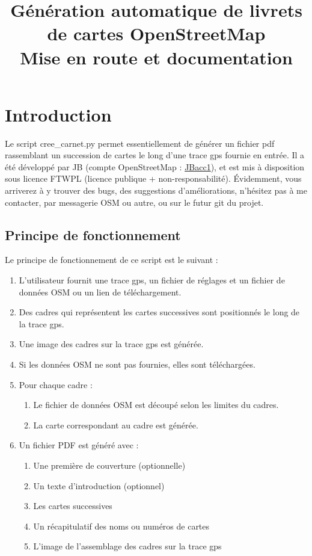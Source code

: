 \documentclass[12pt,french]{article}
\begin{document}
\title{Génération automatique de livrets de cartes OpenStreetMap\\ Mise en route et documentation}
\date{}
\author{}


\maketitle
\tableofcontents
\newpage

\section{Introduction}
Le script cree\_carnet.py permet essentiellement de générer un fichier pdf rassemblant un succession de cartes le long d'une trace gps fournie en entrée. Il a été développé par JB (compte OpenStreetMap : \href{http://openstreetmap.org/user/JBacc1}{JBacc1}), et est mis à disposition sous licence FTWPL (licence publique + non-responsabilité). Évidemment, vous arriverez à y trouver des bugs, des suggestions d'améliorations, n'hésitez pas à me contacter, par messagerie OSM ou autre, ou sur le futur git du projet. 
\subsection{Principe de fonctionnement}
Le principe de fonctionnement de ce script est le suivant :
\begin{enumerate}
\item L'utilisateur fournit une trace gps, un fichier de réglages et un fichier de données OSM ou un lien de téléchargement.
\item \label{a} Des cadres qui représentent les cartes successives sont positionnés le long de la trace gps.
\item \label{b} Une image des cadres sur la trace gps est générée.
\item Si les données OSM ne sont pas fournies, elles sont téléchargées.
\item Pour chaque cadre :
 \begin{enumerate}
  \item \label{c} Le fichier de données OSM est découpé selon les limites du cadres.
  \item \label{d} La carte correspondant au cadre est générée.
 \end{enumerate}
\item \label{e} Un fichier PDF est généré avec :
 \begin{enumerate}
  \item Une première de couverture (optionnelle)
  \item Un texte d'introduction (optionnel)
  \item Les cartes successives
  \item Un récapitulatif des noms ou numéros de cartes
  \item L'image de l'assemblage des cadres sur la trace gps
 \end{enumerate}
\end{enumerate}
\end{document}
